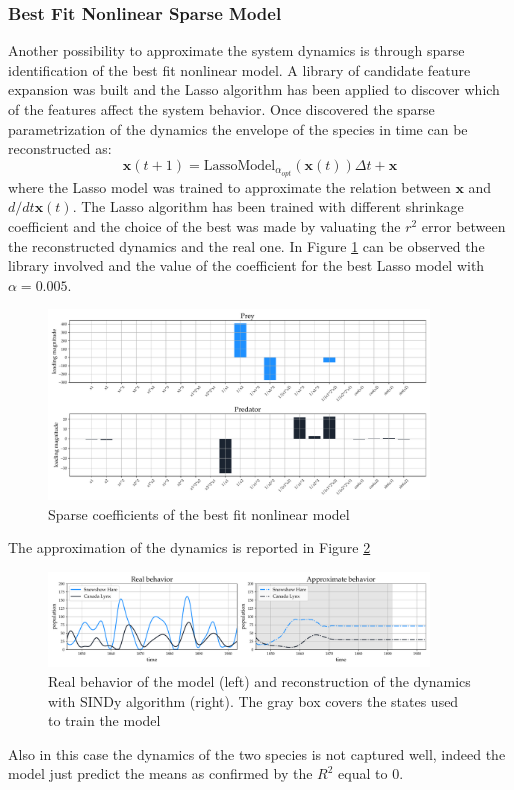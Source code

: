 \documentclass[]{article}
\begin{document}
\subsubsection{Best Fit Nonlinear Sparse Model}
Another possibility to approximate the system dynamics is through sparse identification of the best fit nonlinear model. A library of candidate feature expansion was built and the Lasso algorithm has been applied to discover which of the features affect the system behavior. Once discovered the sparse parametrization of the dynamics the envelope of the species in time can be reconstructed as:
\begin{equation}\label{nlbestfit}
\textbf{x}(t+1) = \text{LassoModel}_{\alpha_{opt}}(\textbf{x}(t)) \Delta t + \textbf{x}
\end{equation}
where the Lasso model was trained to approximate the relation between $\textbf{x}$ and $d/dt \textbf{x}(t)$. The Lasso algorithm has been trained with different shrinkage coefficient and the choice of the best was made by valuating the $r^2$ error between the reconstructed dynamics and the real one. In Figure \ref{fig:fig5} can be observed the library involved and the value of the coefficient for the best Lasso model with $\alpha=0.005$.
\begin{figure}[!b]
	\centering
	\includegraphics[width=0.9\textwidth]{../figures/nl_param_fit.pdf}
	\caption{Sparse coefficients of the best fit nonlinear model}
	\label{fig:fig5}
\end{figure}
The approximation of the dynamics is reported in Figure \ref{fig:fig6}
\begin{figure}[!t]
	\centering
	\includegraphics[width=0.9\textwidth]{../figures/nl_history_fit.pdf}
	\caption{Real behavior of the model (left) and reconstruction of the dynamics with SINDy algorithm (right). The gray box covers the states used to train the model}
	\label{fig:fig6}
\end{figure}
Also in this case the dynamics of the two species is not captured well, indeed the model just predict the means as confirmed by the $R^2$ equal to $0$.
\end{document}
